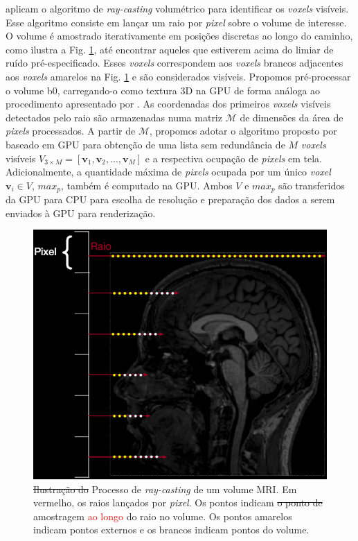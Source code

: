   aplicam o algoritmo de \textit{ray-casting} volumétrico para identificar os \textit{voxels} visíveis. Esse algoritmo consiste em lançar um raio por \textit{pixel} sobre o volume de interesse. O volume é amostrado iterativamente em posições discretas ao longo do caminho, como ilustra a Fig. \ref{fig::raycasting_2d}, até encontrar aqueles que estiverem acima do limiar de ruído pré-especificado. Esses \textit{voxels} correspondem aos \textit{voxels} brancos adjacentes aos \textit{voxels} amarelos na Fig. \ref{fig::raycasting_2d} e são considerados visíveis. Propomos pré-processar o volume b0, carregando-o como textura 3D na GPU de forma análoga ao procedimento apresentado por . As coordenadas dos primeiros \textit{voxels} visíveis detectados pelo raio são armazenadas numa matriz $\mathscr{M}$ de dimensões da área de \textit{pixels} processados. A partir de $\mathscr{M}$, propomos adotar o algoritmo proposto por  baseado em GPU para obtenção de uma lista sem redundância de $M$ \textit{voxels} visíveis $V_{3 \times M} = [
\mathbf{v}_1,
\mathbf{v}_2, ..., 
\mathbf{v}_M
]$ e a respectiva ocupação de \textit{pixels} em tela. Adicionalmente, a quantidade máxima de \textit{pixels} ocupada por um único \textit{voxel} $\mathbf{v}_i \in V$, $max_p$, também é computado na GPU. Ambos $V$ e $max_p$ são transferidos da GPU para CPU para escolha de resolução e preparação dos dados a serem enviados à GPU para renderização.

 
 \begin{figure}[ht]
    \centering
    \includegraphics[width=.55\linewidth, angle=0]{figs/Esquema_Glifo/raycasting/raycasting_2d_2.png}
    \caption{\sout{Ilustração do }Processo de \textit{ray-casting} de um volume MRI. Em vermelho, os raios lançados por \textit{pixel}. Os pontos indicam \sout{o ponto de} amostragem \textcolor{red}{ao longo }do raio no volume. Os pontos amarelos indicam pontos externos e os brancos indicam pontos do volume.
     }
     \label{fig::raycasting_2d}
\end{figure}


